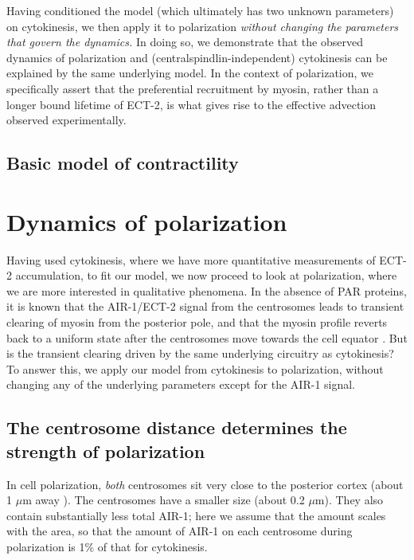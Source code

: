 \documentclass[11pt]{article}
\begin{document}
Having conditioned the model (which ultimately has two unknown parameters) on cytokinesis, we then apply it to polarization \emph{without changing the parameters that govern the dynamics.} In doing so, we demonstrate that the observed dynamics of polarization and (centralspindlin-independent) cytokinesis can be explained by the same underlying model. In the context of polarization, we specifically assert that the preferential recruitment by myosin, rather than a longer bound lifetime of ECT-2, is what gives rise to the effective advection observed experimentally. 

\subsection{Basic model of contractility}

\section{Dynamics of polarization}
Having used cytokinesis, where we have more quantitative measurements of ECT-2 accumulation, to fit our model, we now proceed to look at polarization, where we are more interested in qualitative phenomena. In the absence of PAR proteins, it is known that the AIR-1/ECT-2 signal from the centrosomes leads to transient clearing of myosin from the posterior pole, and that the myosin profile reverts back to a uniform state after the centrosomes move towards the cell equator \citep[Fig.~2E]{gross2019guiding}. But is the transient clearing driven by the same underlying circuitry as cytokinesis? To answer this, we apply our model from cytokinesis to polarization, without changing any of the underlying parameters except for the AIR-1 signal.

\subsection{The centrosome distance determines the strength of polarization \label{sec:airpol}}
In cell polarization, \emph{both} centrosomes sit very close to the posterior cortex (about 1 $\mu$m away \citep{cowan2004centrosomes}). The centrosomes have a smaller size (about 0.2 $\mu$m). They also contain substantially less total AIR-1; here we assume that the amount scales with the area, so that the amount of AIR-1 on each centrosome during polarization is 1\% of that for cytokinesis. 
\end{document}
